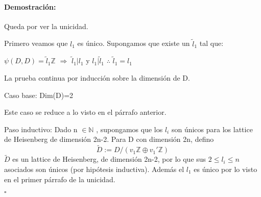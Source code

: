 \documentclass[12pt]{article}
\newenvironment{proof}{\paragraph{Demostración:}}{\hfill$\square$}
\begin{document}
\begin{proof}
Queda por ver la unicidad.

Primero veamos que $l_1$ es único. Supongamos que  existe un $\tilde{l}_1$ tal que: 

$\psi(D,D)=\tilde{l}_1 \mathbb{Z}$ $\Rightarrow$ $\tilde{l}_1 | l_1$ y $l_1 | \tilde{l}_1$ $\therefore$ $\tilde{l}_1=l_1$

La prueba continua por inducción sobre la dimensión de D.

Caso base: Dim(D)=2

Este caso se reduce a lo visto en el párrafo anterior.

Paso inductivo: Dado n $\in \mathbb{N}$ , supongamos que los $l_i$ son únicos para los lattice de Heisenberg de dimensión 2n-2.
Para D con dimensión 2n, defino 
$$\tilde{D}:=D/(v_1 \mathbb{Z} \oplus v_1' \mathbb{Z})$$
$\tilde{D}$ es un lattice de Heisenberg, de dimensión 2n-2, por lo que sus $2\leq l_i\leq n$ asociados son únicos
(por hipótesis inductiva). Además el $l_1$ es único por lo visto en el primer párrafo de la unicidad.

 \end{proof}
 
\end{document}
